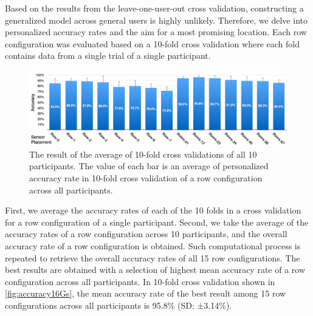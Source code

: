 \documentclass{sigchi}
\begin{document}
Based on the results from the leave-one-user-out cross validation, constructing a generalized model across general users is highly unlikely. Therefore, we delve into personalized accuracy rates and the aim for a most promising location.
Each row configuration was evaluated based on a 10-fold cross validation where each fold contains data from a single trial of a single participant.

\begin{figure}
 \begin{center}
  \includegraphics[width=2\columnwidth]{figures/10FCV_16_v2.pdf}
  \caption{
    The result of the average of 10-fold cross validations of all 10 participants. The value of each bar is an average of personalized accuracy rate in 10-fold cross validation of a row configuration across all participants.
  }
  \label{fig:accuracy16Gs}
  \end{center}
\end{figure}
First, we average the accuracy rates of each of the 10 folds in a cross validation for a row configuration of a single participant.
Second, we take the average of the accuracy rates of a row configuration across 10 participants, and the overall accuracy rate of a row configuration is obtained.
Such computational process is repeated to retrieve the overall accuracy rates of all 15 row configurations.
The best results are obtained with a selection of highest mean accuracy rate of a row configuration across all participants.
In 10-fold cross validation shown in \autoref{fig:accuracy16Gs}, the mean accuracy rate of the best result among 15 row configurations across all participants is 95.8\% (SD: ±3.14\%).
\end{document}
